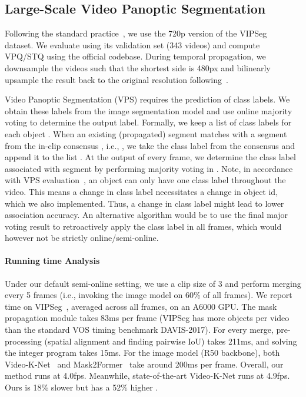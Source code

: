 \subsection{Large-Scale Video Panoptic Segmentation}\label{sec:app:expr-vipseg}
Following the standard practice~\cite{miao2022large}, we use the 720p version of the VIPSeg~\cite{miao2022large} dataset. 
We evaluate using its validation set (343 videos) and compute VPQ/STQ using the official codebase.
During temporal propagation, we downsample the videos such that the shortest side is 480px and bilinearly upsample the result back to the original resolution following~\cite{cheng2022xmem}.

Video Panoptic Segmentation (VPS) requires the prediction of class labels. 
We obtain these labels from the image segmentation model and use online majority voting to determine the output label.
Formally, we keep a list of class labels  for each object . 
When an existing (propagated) segment  matches with a segment from the in-clip consensus , i.e., , we take the class label from the consensus  and append it to the list . 
At the output of every frame, we determine the class label associated with segment  by performing majority voting in .
Note, in accordance with VPS evaluation~\cite{kim2020video}, an object can only have one class label throughout the video.
This means a change in class label necessitates a change in object id, which we also implemented.
Thus, a change in class label might lead to lower association accuracy.
An alternative algorithm would be to use the final major voting result to retroactively apply the class label in all frames, which would however not be strictly online/semi-online.

\paragraph{Running time Analysis}
Under our default semi-online setting, we use a clip size of 3 and perform merging every 5 frames (i.e., invoking the image model on 60\% of all frames).
We report time on VIPSeg~\cite{miao2022large}, averaged across all frames, on an A6000 GPU.
The mask propagation module takes 83ms per frame (VIPSeg has more objects per video than the standard VOS timing benchmark DAVIS-2017). 
For every merge, pre-processing (spatial alignment and finding pairwise IoU) takes 211ms, and solving the integer program takes 15ms.
For the image model (R50 backbone), both Video-K-Net~\cite{li2022video} and Mask2Former~\cite{cheng2022masked} take around 200ms per frame.
Overall, our method runs at 4.0fps.
Meanwhile, state-of-the-art Video-K-Net runs at 4.9fps. Ours is 18\% slower but has a 52\% higher .


